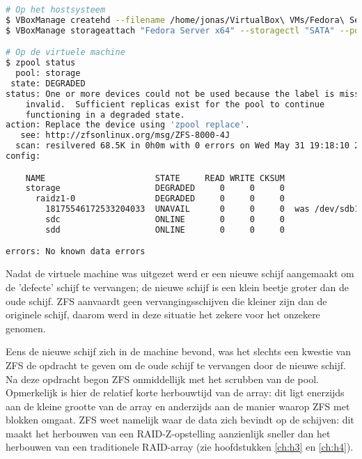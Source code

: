 \begin{lstlisting}[language=bash,style=command_style]
# Op het hostsysteem
$ VBoxManage createhd --filename /home/jonas/VirtualBox\ VMs/Fedora\ Server\ x64/TestZFS.vdi --size 42000 --format VDI --variant Fixed
$ VBoxManage storageattach "Fedora Server x64" --storagectl "SATA" --port 1 --device 0 --type HDD --medium /home/jonas/VirtualBox\ VMs/Fedora\ Server\ x64/TestZFS.vdi --mtype shareable

# Op de virtuele machine
$ zpool status
  pool: storage
 state: DEGRADED
status: One or more devices could not be used because the label is missing or
	invalid.  Sufficient replicas exist for the pool to continue
	functioning in a degraded state.
action: Replace the device using 'zpool replace'.
   see: http://zfsonlinux.org/msg/ZFS-8000-4J
  scan: resilvered 68.5K in 0h0m with 0 errors on Wed May 31 19:18:10 2017
config:

	NAME                      STATE     READ WRITE CKSUM
	storage                   DEGRADED     0     0     0
	  raidz1-0                DEGRADED     0     0     0
	    18175546172533204033  UNAVAIL      0     0     0  was /dev/sdb1
	    sdc                   ONLINE       0     0     0
	    sdd                   ONLINE       0     0     0

errors: No known data errors
\end{lstlisting}

Nadat de virtuele machine was uitgezet werd er een nieuwe schijf aangemaakt om de 'defecte' schijf te vervangen; de nieuwe schijf is een klein beetje groter dan de oude schijf. ZFS aanvaardt geen vervangingsschijven die kleiner zijn dan de originele schijf, daarom werd in deze situatie het zekere voor het onzekere genomen. 

Eens de nieuwe schijf zich in de machine bevond, was het slechts een kwestie van ZFS de opdracht te geven om de oude schijf te vervangen door de nieuwe schijf. Na deze opdracht begon ZFS onmiddellijk met het scrubben van de pool. Opmerkelijk is hier de relatief korte herbouwtijd van de array: dit ligt enerzijds aan de kleine grootte van de array en anderzijds aan de manier waarop ZFS met blokken omgaat. ZFS weet namelijk waar de data zich bevindt op de schijven: dit maakt het herbouwen van een RAID-Z-opstelling aanzienlijk sneller dan het herbouwen van een traditionele RAID-array (zie hoofdstukken \ref{ch:h3} en \ref{ch:h4}).

